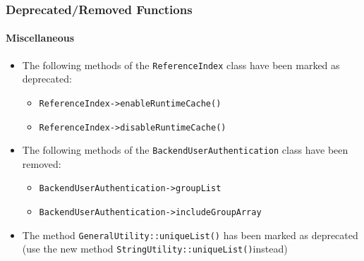 %

\begin{frame}[fragile]
	\frametitle{Deprecated/Removed Functions}
	\framesubtitle{Miscellaneous}

	\begin{itemize}
		\item The following methods of the \texttt{ReferenceIndex} class have been marked as deprecated:
			\begin{itemize}\smaller
				\item \texttt{ReferenceIndex->enableRuntimeCache()}
				\item \texttt{ReferenceIndex->disableRuntimeCache()}
			\end{itemize}\normalsize

		\item The following methods of the \texttt{BackendUserAuthentication} class have been removed:
			\begin{itemize}\smaller
				\item \texttt{BackendUserAuthentication->groupList}
				\item \texttt{BackendUserAuthentication->includeGroupArray}
			\end{itemize}\normalsize

		\item The method \texttt{GeneralUtility::uniqueList()} has been marked as deprecated
			(use the new method \smaller\texttt{StringUtility::uniqueList()}\normalsize instead)

	\end{itemize}

\end{frame}

